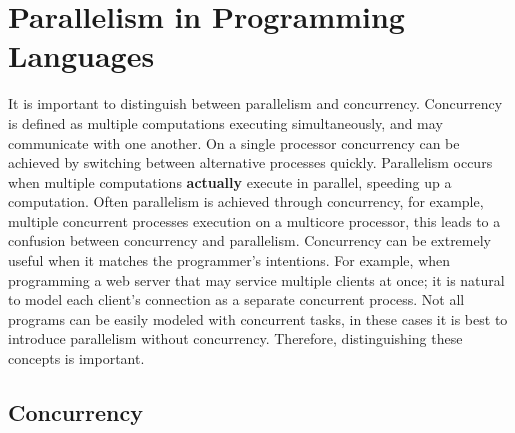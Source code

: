 
\section{Parallelism in Programming Languages}
\label{sec:literature_review}


%



It is important to distinguish between parallelism and concurrency.
Concurrency is defined as multiple computations executing simultaneously,
and may communicate with one another.
On a single processor concurrency can be achieved by switching between
alternative processes quickly.
Parallelism occurs when multiple computations \textbf{actually} execute in parallel,
speeding up a computation.
Often parallelism is achieved through concurrency,
for example, multiple concurrent processes execution on a multicore processor,
this leads to a confusion between concurrency and parallelism.
Concurrency can be extremely useful when it matches the programmer's intentions.
For example,
when programming a web server that may service multiple clients at once;
it is natural to model each client's connection as a separate concurrent process.
Not all programs can be easily modeled with concurrent tasks,
in these cases it is best to introduce parallelism without concurrency.
Therefore, distinguishing these concepts is important.

\subsection{Concurrency}
\label{sec:backgnd_concurrency}

